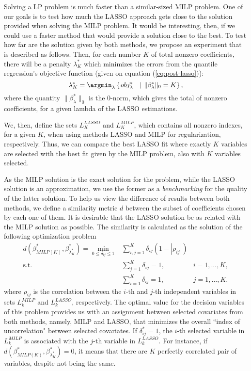 
Solving a LP problem is much faster than a similar-sized MILP problem. One of our goals is to test how much the LASSO approach gets close to the solution provided when solving the MILP problem. It would be interesting, then, if we could use a faster method that would provide a solution close to the best. To test how far are the solution given by both methods, we propose an experiment that is described as follows. Then, for each number $K$ of total nonzero coefficients, there will be a penalty $\lambda^*_K$ which minimizes the errors from the quantile regression's objective function (given on equation (\ref{eq:post-lasso})): 
\begin{equation}
\lambda^*_K = \argmin_\lambda \left\lbrace \left.  obj_{\lambda}^{*} \quad  \right| \, \| \beta^*_\lambda \|_0 = K \right\rbrace,
\end{equation}
where the quantity $\| \beta^*_\lambda \|_0$ is the $0$-norm, which gives the total of nonzero coefficients, for a given lambda of the LASSO estimations.

We, then, define the sets $L_K^{LASSO}$ and $L_K^{MILP}$, which contains all nonzero indexes, for a given $K$, when using methods LASSO and MILP for regularization, respectively.
Thus, we can compare the best LASSO fit where exactly $K$ variables are selected with the best fit given by the MILP problem, also with $K$ variables selected.

As the MILP solution is the exact solution for the problem, while the LASSO solution is an approximation, we use the former as a \textit{benchmarking} for the quality of the latter solution. To help us view the difference of results between both methods, we define a similarity metric $d$ between the subset of coefficients chosen by each one of them. It is desirable that the LASSO solution be as related with the MILP solution as possible.
The similarity is calculated as the solution of the following optimization problem
\begin{eqnarray}
d(\beta^*_{MILP(K)}, \beta^*_{\lambda^*_K}) = \min_{0\leq\delta_{ij}\leq1} & \sum\limits_{i,j = 1}^K  \delta_{ij} (1-|\rho_{ij}|) \label{eq:metricad0} \\
\text{s.t.} & \sum\limits_{j =1}^K\delta_{ij}=1, &  i=1,\dots,K,\\
& \sum\limits_{i =1}^K\delta_{ij}=1, & j=1,\dots,K,
\end{eqnarray}
where $\rho_{ij}$ is the correlation between the $i$-th and $j$-th independent variables in sets $L_k^{MILP}$ and $L_k^{LASSO}$, respectively. The optimal value for the decision variables of this problem provides us with an assignment between selected covariates from both methods, namely, MILP and LASSO, that minimizes the overall ``index of uncorrelation" between selected covariates. If $\delta^*_{ij} = 1$, the $i$-th selected variable in  $L_k^{MILP}$ is associated with the $j$-th variable  in $L_k^{LASSO}$. For instance, if $d(\beta^*_{MILP(K)}, \beta^*_{\lambda^*_K}) = 0$, it means that there are $K$ perfectly correlated pair of variables, despite not being the same.

